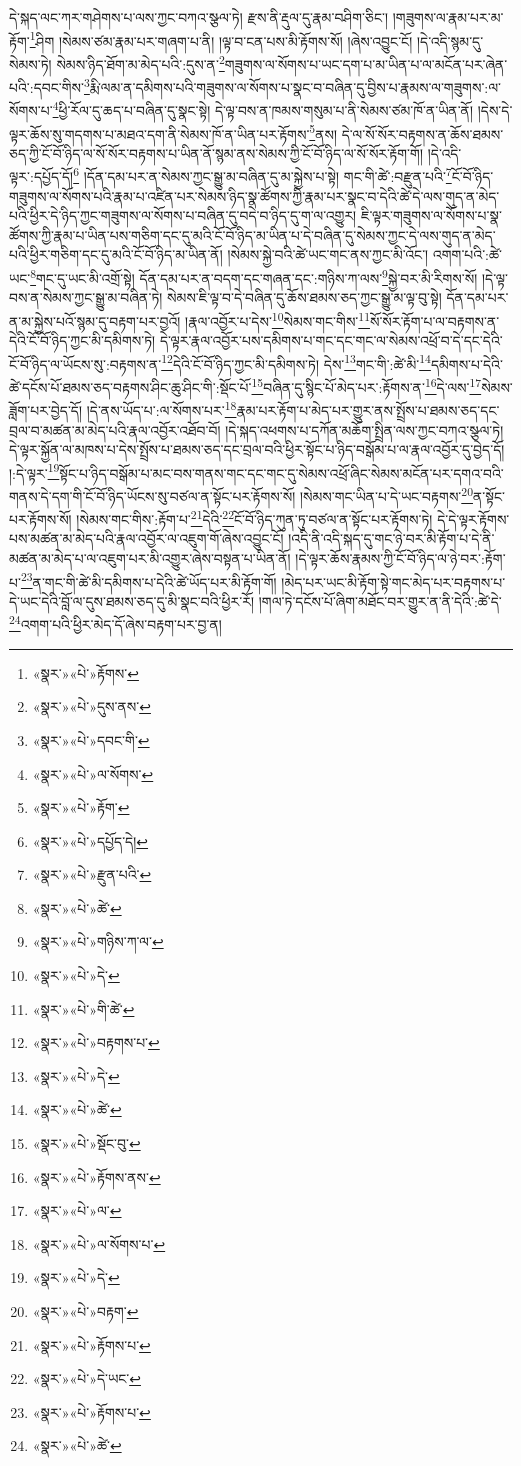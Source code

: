 དེ་སྐད་ལང་ཀར་གཤེགས་པ་ལས་ཀྱང་བཀའ་སྩལ་ཏེ། རྫས་ནི་རྡུལ་དུ་རྣམ་བཤིག་ཅིང་། །གཟུགས་ལ་རྣམ་པར་མ་རྟོག་\footnote{«སྣར་»«པེ་»རྟོགས་}ཤིག །སེམས་ཙམ་རྣམ་པར་གཞག་པ་ནི། །ལྟ་བ་ངན་པས་མི་རྟོགས་སོ། །ཞེས་འབྱུང་ངོ། །དེ་འདི་སྙམ་དུ་སེམས་ཏེ། སེམས་ཉིད་ཐོག་མ་མེད་པའི་:དུས་ན་\footnote{«སྣར་»«པེ་»དུས་ནས་}གཟུགས་ལ་སོགས་པ་ཡང་དག་པ་མ་ཡིན་པ་ལ་མངོན་པར་ཞེན་པའི་:དབང་གིས་\footnote{«སྣར་»«པེ་»དབང་གི་}རྨི་ལམ་ན་དམིགས་པའི་གཟུགས་ལ་སོགས་པ་སྣང་བ་བཞིན་དུ་བྱིས་པ་རྣམས་ལ་གཟུགས་:ལ་སོགས་པ་\footnote{«སྣར་»«པེ་»ལ་སོགས་}ཕྱི་རོལ་དུ་ཆད་པ་བཞིན་དུ་སྣང་སྟེ། དེ་ལྟ་བས་ན་ཁམས་གསུམ་པ་ནི་སེམས་ཙམ་ཁོ་ན་ཡིན་ནོ། །དེས་དེ་ལྟར་ཆོས་སུ་གདགས་པ་མཐའ་དག་ནི་སེམས་ཁོ་ན་ཡིན་པར་རྟོགས་\footnote{«སྣར་»«པེ་»རྟོག་}ནས། དེ་ལ་སོ་སོར་བརྟགས་ན་ཆོས་ཐམས་ཅད་ཀྱི་ངོ་བོ་ཉིད་ལ་སོ་སོར་བརྟགས་པ་ཡིན་ནོ་སྙམ་ནས་སེམས་ཀྱི་ངོ་བོ་ཉིད་ལ་སོ་སོར་རྟོག་གོ། །དེ་འདི་ལྟར་:དཔྱོད་དོ།\footnote{«སྣར་»«པེ་»དཔྱོད་དེ།} །དོན་དམ་པར་ན་སེམས་ཀྱང་སྒྱུ་མ་བཞིན་དུ་མ་སྐྱེས་པ་སྟེ། གང་གི་ཚེ་:བརྫུན་པའི་\footnote{«སྣར་»«པེ་»རྫུན་པའི་}ངོ་བོ་ཉིད་གཟུགས་ལ་སོགས་པའི་རྣམ་པ་འཛིན་པར་སེམས་ཉིད་སྣ་ཚོགས་ཀྱི་རྣམ་པར་སྣང་བ་དེའི་ཚེ་དེ་ལས་གུད་ན་མེད་པའི་ཕྱིར་དེ་ཉིད་ཀྱང་གཟུགས་ལ་སོགས་པ་བཞིན་དུ་བདེ་བ་ཉིད་དུ་ག་ལ་འགྱུར། ཇི་ལྟར་གཟུགས་ལ་སོགས་པ་སྣ་ཚོགས་ཀྱི་རྣམ་པ་ཡིན་པས་གཅིག་དང་དུ་མའི་ངོ་བོ་ཉིད་མ་ཡིན་པ་དེ་བཞིན་དུ་སེམས་ཀྱང་དེ་ལས་གུད་ན་མེད་པའི་ཕྱིར་གཅིག་དང་དུ་མའི་ངོ་བོ་ཉིད་མ་ཡིན་ནོ། །སེམས་སྐྱེ་བའི་ཚེ་ཡང་གང་ནས་ཀྱང་མི་འོང་། འགག་པའི་:ཚེ་ཡང་\footnote{«སྣར་»«པེ་»ཚེ་}གང་དུ་ཡང་མི་འགྲོ་སྟེ། དོན་དམ་པར་ན་བདག་དང་གཞན་དང་:གཉིས་ཀ་ལས་\footnote{«སྣར་»«པེ་»གཉིས་ཀ་ལ་}སྐྱེ་བར་མི་རིགས་སོ། །དེ་ལྟ་བས་ན་སེམས་ཀྱང་སྒྱུ་མ་བཞིན་ཏེ། སེམས་ཇི་ལྟ་བ་དེ་བཞིན་དུ་ཆོས་ཐམས་ཅད་ཀྱང་སྒྱུ་མ་ལྟ་བུ་སྟེ། དོན་དམ་པར་ན་མ་སྐྱེས་པའོ་སྙམ་དུ་བརྟག་པར་བྱའོ། །རྣལ་འབྱོར་པ་དེས་\footnote{«སྣར་»«པེ་»དེ་}སེམས་གང་གིས་\footnote{«སྣར་»«པེ་»གི་ཚེ་}སོ་སོར་རྟོག་པ་ལ་བརྟགས་ན་དེའི་ངོ་བོ་ཉིད་ཀྱང་མི་དམིགས་ཏེ། དེ་ལྟར་རྣལ་འབྱོར་པས་དམིགས་པ་གང་དང་གང་ལ་སེམས་འཕྲོ་བ་དེ་དང་དེའི་ངོ་བོ་ཉིད་ལ་ཡོངས་སུ་:བརྟགས་ན་\footnote{«སྣར་»«པེ་»བརྟགས་པ་}དེའི་ངོ་བོ་ཉིད་ཀྱང་མི་དམིགས་ཏེ། དེས་\footnote{«སྣར་»«པེ་»དེ་}གང་གི་:ཚེ་མི་\footnote{«སྣར་»«པེ་»ཚེ་}དམིགས་པ་དེའི་ཚེ་དངོས་པོ་ཐམས་ཅད་བརྟགས་ཤིང་ཆུ་ཤིང་གི་:སྡོང་པོ་\footnote{«སྣར་»«པེ་»སྡོང་བུ་}བཞིན་དུ་སྙིང་པོ་མེད་པར་:རྟོགས་ན་\footnote{«སྣར་»«པེ་»རྟོགས་ནས་}དེ་ལས་\footnote{«སྣར་»«པེ་»ལ་}སེམས་ཟློག་པར་བྱེད་དོ། །དེ་ནས་ཡོད་པ་:ལ་སོགས་པར་\footnote{«སྣར་»«པེ་»ལ་སོགས་པ་}རྣམ་པར་རྟོག་པ་མེད་པར་གྱུར་ནས་སྤྲོས་པ་ཐམས་ཅད་དང་བྲལ་བ་མཚན་མ་མེད་པའི་རྣལ་འབྱོར་འཐོབ་བོ། །དེ་སྐད་འཕགས་པ་དཀོན་མཆོག་སྤྲིན་ལས་ཀྱང་བཀའ་སྩལ་ཏེ། དེ་ལྟར་སྐྱོན་ལ་མཁས་པ་དེས་སྤྲོས་པ་ཐམས་ཅད་དང་བྲལ་བའི་ཕྱིར་སྟོང་པ་ཉིད་བསྒོམ་པ་ལ་རྣལ་འབྱོར་དུ་བྱེད་དོ། །:དེ་ལྟར་\footnote{«སྣར་»«པེ་»དེ་}སྟོང་པ་ཉིད་བསྒོམ་པ་མང་བས་གནས་གང་དང་གང་དུ་སེམས་འཕྲོ་ཞིང་སེམས་མངོན་པར་དགའ་བའི་གནས་དེ་དག་གི་ངོ་བོ་ཉིད་ཡོངས་སུ་བཙལ་ན་སྟོང་པར་རྟོགས་སོ། །སེམས་གང་ཡིན་པ་དེ་ཡང་བརྟགས་\footnote{«སྣར་»«པེ་»བརྟག་}ན་སྟོང་པར་རྟོགས་སོ། །སེམས་གང་གིས་:རྟོག་པ་\footnote{«སྣར་»«པེ་»རྟོགས་པ་}དེའི་\footnote{«སྣར་»«པེ་»དེ་ཡང་}ངོ་བོ་ཉིད་ཀུན་ཏུ་བཙལ་ན་སྟོང་པར་རྟོགས་ཏེ། དེ་དེ་ལྟར་རྟོགས་པས་མཚན་མ་མེད་པའི་རྣལ་འབྱོར་ལ་འཇུག་གོ་ཞེས་འབྱུང་ངོ། །འདི་ནི་འདི་སྐད་དུ་གང་ཉེ་བར་མི་རྟོག་པ་དེ་ནི་མཚན་མ་མེད་པ་ལ་འཇུག་པར་མི་འགྱུར་ཞེས་བསྟན་པ་ཡིན་ནོ། །དེ་ལྟར་ཆོས་རྣམས་ཀྱི་ངོ་བོ་ཉིད་ལ་ཉེ་བར་:རྟོག་པ་\footnote{«སྣར་»«པེ་»རྟོགས་པ་}ན་གང་གི་ཚེ་མི་དམིགས་པ་དེའི་ཚེ་ཡོད་པར་མི་རྟོག་གོ། །མེད་པར་ཡང་མི་རྟོག་སྟེ་གང་མེད་པར་བརྟགས་པ་དེ་ཡང་དེའི་བློ་ལ་དུས་ཐམས་ཅད་དུ་མི་སྣང་བའི་ཕྱིར་རོ། །གལ་ཏེ་དངོས་པོ་ཞིག་མཐོང་བར་གྱུར་ན་ནི་དེའི་:ཚེ་དེ་\footnote{«སྣར་»«པེ་»ཚེ་}འགག་པའི་ཕྱིར་མེད་དོ་ཞེས་བརྟག་པར་བྱ་ན། 